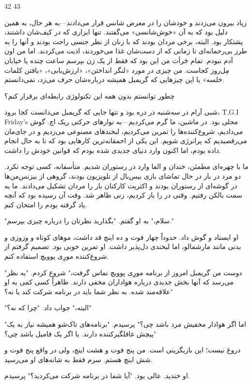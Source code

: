 42 43

زیاد بیرون می‌زدند و خودشان را در معرض شانس قرار می‌دادند—به هر حال، به همین دلیل بود که به آن «خوش‌شانسی» می‌گفتند. تنها ابزاری که در کیف‌شان داشتند، پشتکار بود. البته، برخی مردان بودند که با زنان از نظر جنسی راحت بودند و آنها را به طرز بی‌رحمانه‌ای تا زمانی که از دست‌شان غذا می‌خوردند، اذیت می‌کردند. اما من اون آدم نبودم. تمام جَرأت من این بود که فقط از یک زن بپرسم ساعت چنده یا خیابان مِل‌روز کجاست. من چیزی در مورد «لنگر انداختن»، «ارزش‌یابی»، «یافتن کلمات خلسه» یا این چیزهایی که گریمبل همیشه درباره‌شان حرف می‌زد، نمی‌دانستم.

چطور توانستم بدون همه این تکنولوژی رابطه‌ای برقرار کنم؟

شبی آرام در سه‌شنبه در دره بود و تنها جایی که گریمبل می‌دانست کجا برود، T.G.I Friday's محلی بود. در ماشین، ما گرم می‌کردیم—به نوارها‌ی حرکتی ریک اچ. گوش می‌دادیم، شروع‌کننده‌ها را تمرین می‌کردیم، لبخندهای مصنوعی می‌زدیم و در جای‌مان می‌رقصیدیم که پرانرژی شویم. این یکی از احمقانه‌ترین کارهایی بود که تا به حال انجام داده بودم، اما اکنون وارد دنیای جدیدی شده بودم که قوانین خودش را داشت.

ما با چهره‌ای مطمئن، خندان و الفا وارد در رستوران شدیم. متأسفانه، کسی توجه نکرد. دو مرد در بار در حال تماشای بازی بیس‌بال از تلویزیون بودند، گروهی از بیزنس‌من‌ها در گوشه‌ای از رستوران بودند و اکثریت کارکنان بار را مردان تشکیل می‌دادند. ما به سمت بالکن رفتیم. وقتی در را باز کردیم، زنی ظاهر شد. وقت آن رسیده بود که آنچه یاد گرفته بودم را امتحان کنم.

"سلام،" به او گفتم. "بگذارید نظرتان را درباره چیزی بپرسم."

او ایستاد و گوش داد. حدوداً چهار فوت و ده اینچ قد داشت، موهای کوتاه و وزوزی و بدنی مانند مارشمالو، اما لبخندی دل‌پذیر داشت. او تمرین خوبی بود. تصمیم گرفتم از شروع‌کننده مورِی پوویچ استفاده کنم.

"دوست من گریمبل امروز از برنامه مورِی پوویچ تماس گرفت،" شروع کردم. "به نظر می‌رسد که آنها بخش جدیدی درباره هواداران مخفی دارند. ظاهراً کسی کمی به او علاقه‌مند شده. به نظر شما باید در برنامه شرکت کند یا نه؟"

"البته،" جواب داد. "چرا که نه؟"

"اما اگر هوادار مخفیش مرد باشد چی؟" پرسیدم. "برنامه‌های تاک‌شو همیشه نیاز به یک پیچش غافلگیرکننده دارند. یا اگر یک فامیل باشد چی؟"

دروغ نیست؛ این بازیگزینی است. من پنج فوت و هشت اینچ، ولی در واقع پنج فوت و شش اینچ هستم. سرم فقط به شانه‌های او می‌رسید.

او خندید. عالی بود. "آیا شما در برنامه شرکت می‌کردید؟" پرسیدم.

